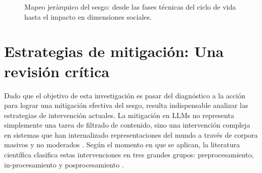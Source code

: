\documentclass[12pt,a4paper]{report}
\begin{document}
\begin{figure}[H]
    \caption{Mapeo jerárquico del sesgo: desde las fases técnicas del ciclo de vida hasta el impacto en dimensiones sociales.}
    \label{fig:taxonomia_sesgo}
\end{figure}

\section{Estrategias de mitigación: Una revisión crítica}
\label{sec:mitigacion_critica}

Dado que el objetivo de esta investigación es pasar del diagnóstico a la acción para lograr una mitigación efectiva del sesgo, resulta indispensable analizar las estrategias de intervención actuales. La mitigación en LLMs no representa simplemente una tarea de filtrado de contenido, sino una intervención compleja en sistemas que han internalizado representaciones del mundo a través de corpora masivos y no moderados \cite{wang_aligning_2023}. Según el momento en que se aplican, la literatura científica clasifica estas intervenciones en tres grandes grupos: preprocesamiento, in-procesamiento y posprocesamiento \cite{shah_comprehensive_2025, guo_bias_2024}.
\end{document}
